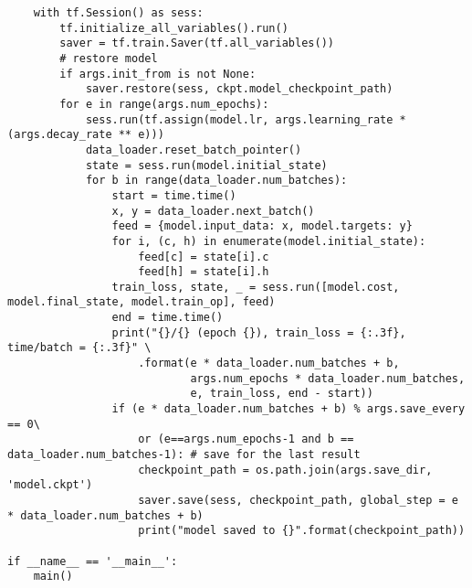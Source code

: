 \begin{lstlisting}
    with tf.Session() as sess:
        tf.initialize_all_variables().run()
        saver = tf.train.Saver(tf.all_variables())
        # restore model
        if args.init_from is not None:
            saver.restore(sess, ckpt.model_checkpoint_path)
        for e in range(args.num_epochs):
            sess.run(tf.assign(model.lr, args.learning_rate * (args.decay_rate ** e)))
            data_loader.reset_batch_pointer()
            state = sess.run(model.initial_state)
            for b in range(data_loader.num_batches):
                start = time.time()
                x, y = data_loader.next_batch()
                feed = {model.input_data: x, model.targets: y}
                for i, (c, h) in enumerate(model.initial_state):
                    feed[c] = state[i].c
                    feed[h] = state[i].h
                train_loss, state, _ = sess.run([model.cost, model.final_state, model.train_op], feed)
                end = time.time()
                print("{}/{} (epoch {}), train_loss = {:.3f}, time/batch = {:.3f}" \
                    .format(e * data_loader.num_batches + b,
                            args.num_epochs * data_loader.num_batches,
                            e, train_loss, end - start))
                if (e * data_loader.num_batches + b) % args.save_every == 0\
                    or (e==args.num_epochs-1 and b == data_loader.num_batches-1): # save for the last result
                    checkpoint_path = os.path.join(args.save_dir, 'model.ckpt')
                    saver.save(sess, checkpoint_path, global_step = e * data_loader.num_batches + b)
                    print("model saved to {}".format(checkpoint_path))

if __name__ == '__main__':
    main()
\end{lstlisting}




